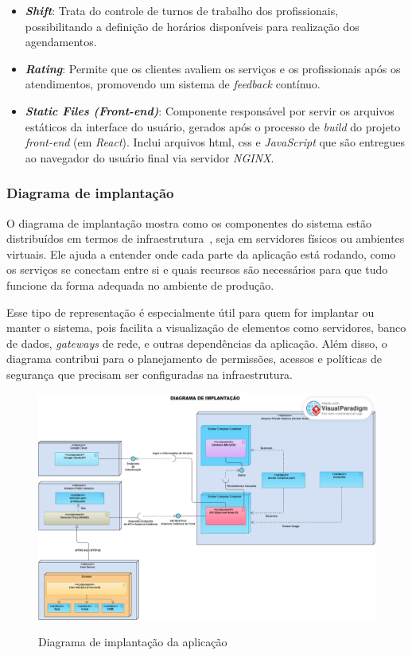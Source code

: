 \begin{itemize}
  \item \textbf{\emph{Shift}}: Trata do controle de turnos de trabalho dos profissionais, possibilitando a definição de horários disponíveis para realização dos agendamentos.

  \item \textbf{\emph{Rating}}: Permite que os clientes avaliem os serviços e os profissionais após os atendimentos, promovendo um sistema de \emph{feedback} contínuo.
  
  \item \textbf{\emph{Static Files (Front-end)}}: Componente responsável por servir os arquivos estáticos da interface do usuário, gerados após o processo de \textit{build} do projeto \emph{front-end} (em \emph{React}). Inclui arquivos \gls{html}, \gls{css} e \emph{JavaScript} que são entregues ao navegador do usuário final via servidor \emph{NGINX}.
\end{itemize}

\subsubsection{Diagrama de implantação}

O diagrama de implantação mostra como os componentes do sistema estão distribuídos em termos de infraestrutura~\cite{Booch2005}, seja em servidores físicos ou ambientes virtuais. Ele ajuda a entender onde cada parte da aplicação está rodando, como os serviços se conectam entre si e quais recursos são necessários para que tudo funcione da forma adequada no ambiente de produção.

Esse tipo de representação é especialmente útil para quem for implantar ou manter o sistema, pois facilita a visualização de elementos como servidores, banco de dados, \emph{gateways} de rede, e outras dependências da aplicação. Além disso, o diagrama contribui para o planejamento de permissões, acessos e políticas de segurança que precisam ser configuradas na infraestrutura.

\begin{figure}[htb]
  \centering
  \caption{Diagrama de implantação da aplicação}
  \includegraphics[width=\textwidth]{cap04-desenvolvimento/images/4-3-2-2-diagrama-implantacao}
  \label{fig:diagrama-implantacao}
\end{figure}
\FloatBarrier

